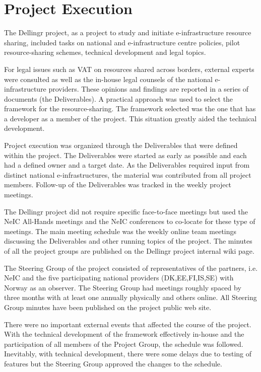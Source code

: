 \documentclass{article}
\newcommand{\dell}{Dellingr\xspace}
\newcommand{\einfra}{e-infrastructure\xspace}
\begin{document}
\section{Project Execution}

The \dell project, as a project to study and initiate \einfra resource sharing, included tasks on national and \einfra centre policies, pilot resource-sharing schemes, technical development and legal topics.

For legal issues such as VAT on resources shared across borders, external experts were consulted as well as the in-house legal
counsels of the national \einfra providers.
These opinions and findings are reported in a series of documents (the Deliverables).
A practical approach was used to select the framework for the resource-sharing.
The framework selected was the one that has a developer as a member of the project.
This situation greatly aided the technical development.

Project execution was organized through the Deliverables that were defined within the project.
The Deliverables were started as early as possible and each had a defined owner and a target date.
As the Deliverables required input from distinct national \einfra{s}, the material was contributed from all project members.
Follow-up of the Deliverables was tracked in the weekly project meetings.

The \dell project did not require specific face-to-face meetings but used the NeIC All-Hands meetings and the NeIC conferences
to co-locate for these type of meetings.
The main meeting schedule was the weekly online team meetings discussing the Deliverables and other running topics of the project.
The minutes of all the project groups are published on the \dell project internal wiki page.

The Steering Group of the project consisted of representatives of the partners, i.e. NeIC and the five participating national providers
(DK,EE,FI,IS,SE) with Norway as an observer.
The Steering Group had meetings roughly spaced by three months with at least one annually physically and others online.
All Steering Group minutes have been published on the project public web site.

There were no important external events that affected the course of the project.
With the technical development of the framework effectively in-house and the participation
of all members of the Project Group, the schedule was followed.
Inevitably, with technical development, there were some delays due to testing of features but
the Steering Group approved the changes to the schedule.
\end{document}

